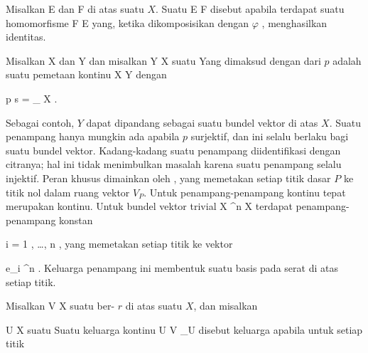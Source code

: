 {}
{

Misalkan
\mathkor {} {E} {dan} {F} {}
di atas suatu
$X$. Suatu
\maabb {\varphi} { E } { F
} {}
disebut
apabila terdapat suatu homomorfisme
\maabb {\psi} { F } { E
} {}
yang, ketika dikomposisikan dengan $\varphi$
 {} {}, menghasilkan identitas.

}

{}
{

Misalkan
\mathkor {} {X} {dan} {Y} {}
dan misalkan
 { Y } { X
} {}
suatu
Yang dimaksud dengan
dari $p$ adalah suatu pemetaan kontinu
 { X } { Y
} {}
dengan

\mavergleichskettedisp
{\vergleichskette
{  p \circ s
}
{ =} {
_{  X  }
}
{ } {
}
{ } {
}
{ } {
}
}
{}{}{.}

}
Sebagai contoh, $Y$ dapat dipandang sebagai suatu bundel vektor di atas $X$. Suatu penampang hanya mungkin ada apabila $p$ surjektif, dan ini selalu berlaku bagi suatu bundel vektor. Kadang-kadang suatu penampang diidentifikasi dengan citranya; hal ini tidak menimbulkan masalah karena suatu penampang selalu injektif. Peran khusus dimainkan oleh  {,} yang memetakan setiap titik dasar $P$ ke titik nol dalam ruang vektor $V_P$.
Untuk
penampang-penampang kontinu tepat merupakan
kontinu. Untuk bundel vektor trivial
\maabbdisp {} {X \times \R^n } { X
} {}
terdapat penampang-penampang konstan

 {}
 {i = 1 , \ldots , n} {}
 {} {} {} {,}
yang memetakan setiap titik ke vektor

\mavergleichskette
{\vergleichskette
{ e_i
}
{ \in }{ \R^n
}
{  }{
}
{    }{
}
{   }{
}
}
{}{}{}
. Keluarga penampang ini membentuk suatu basis pada serat di atas setiap titik.

Misalkan
 { V } { X
} {}
suatu
ber-
$r$ di atas suatu
$X$, dan misalkan

\mavergleichskette
{\vergleichskette
{ U
}
{ \subseteq }{ X
}
{  }{
}
{    }{
}
{   }{
}
}
{}{}{}
suatu
Suatu keluarga
kontinu
 { U} {V  \vert_U
} {}
disebut keluarga
apabila untuk setiap titik

